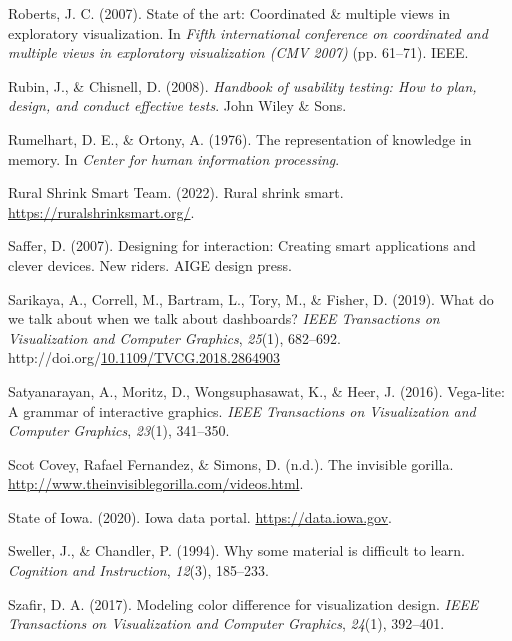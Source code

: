\documentclass[print]{nuthesis}
\newlength{\cslhangindent}
\newenvironment{CSLReferences}[2]%
{\setlength{\parindent}{0pt}%
\everypar{\setlength{\hangindent}{\cslhangindent}}\ignorespaces}%
{\par}
\begin{document}
\begin{CSLReferences}{1}{0}
\leavevmode{}%
Roberts, J. C. (2007). State of the art: Coordinated \& multiple views in exploratory visualization. In \emph{Fifth international conference on coordinated and multiple views in exploratory visualization (CMV 2007)} (pp. 61--71). IEEE.

\leavevmode{}%
Rubin, J., \& Chisnell, D. (2008). \emph{Handbook of usability testing: How to plan, design, and conduct effective tests}. John Wiley \& Sons.

\leavevmode{}%
Rumelhart, D. E., \& Ortony, A. (1976). The representation of knowledge in memory. In \emph{Center for human information processing}.

\leavevmode{}%
Rural Shrink Smart Team. (2022). Rural shrink smart. \url{https://ruralshrinksmart.org/}.

\leavevmode{}%
Saffer, D. (2007). Designing for interaction: Creating smart applications and clever devices. New riders. AIGE design press.

\leavevmode{}%
Sarikaya, A., Correll, M., Bartram, L., Tory, M., \& Fisher, D. (2019). What do we talk about when we talk about dashboards? \emph{IEEE Transactions on Visualization and Computer Graphics}, \emph{25}(1), 682--692. http://doi.org/\href{https://doi.org/10.1109/TVCG.2018.2864903}{10.1109/TVCG.2018.2864903}

\leavevmode{}%
Satyanarayan, A., Moritz, D., Wongsuphasawat, K., \& Heer, J. (2016). Vega-lite: A grammar of interactive graphics. \emph{IEEE Transactions on Visualization and Computer Graphics}, \emph{23}(1), 341--350.

\leavevmode{}%
Scot Covey, Rafael Fernandez, \& Simons, D. (n.d.). The invisible gorilla. \url{http://www.theinvisiblegorilla.com/videos.html}.

\leavevmode{}%
State of Iowa. (2020). Iowa data portal. \url{https://data.iowa.gov}.

\leavevmode{}%
Sweller, J., \& Chandler, P. (1994). Why some material is difficult to learn. \emph{Cognition and Instruction}, \emph{12}(3), 185--233.

\leavevmode{}%
Szafir, D. A. (2017). Modeling color difference for visualization design. \emph{IEEE Transactions on Visualization and Computer Graphics}, \emph{24}(1), 392--401.


\end{CSLReferences}
\end{document}
